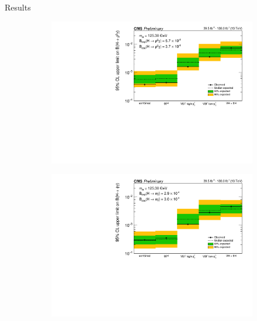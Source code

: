 \documentclass[9pt,aspectratio=1610]{beamer}
\begin{document}
\begin{frame}{Results}
	\begin{figure}
		\begin{subfigure}{.36\textwidth}
			\centering
			\includegraphics[width=\textwidth]{figures/limitRho_final_feb29.pdf}
		\end{subfigure}%
		\begin{subfigure}{.36\textwidth}
			\centering
			\includegraphics[width=\textwidth]{figures/limitPhi_final_feb29.pdf}
		\end{subfigure}\\
		\begin{subfigure}{.36\textwidth}
			\centering

\end{subfigure}
\end{figure}
\end{frame}
\end{document}
